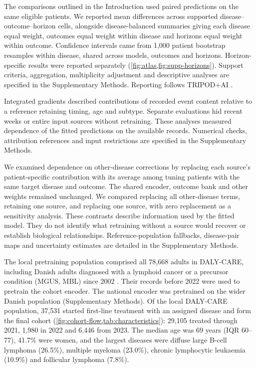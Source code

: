 The comparisons outlined in the Introduction used paired predictions on the
same eligible patients. We reported mean differences across supported
disease--outcome--horizon cells, alongside disease-balanced summaries giving
each disease equal weight, outcomes equal weight within disease and horizons
equal weight within outcome. Confidence intervals came from 1,000 patient
bootstrap resamples within disease, shared across models, outcomes and
horizons. Horizon-specific results were reported separately
(\cref{fig:atlas,fig:supp-horizons}). Support criteria, aggregation, multiplicity
adjustment and descriptive analyses are specified in the Supplementary Methods.
Reporting follows TRIPOD+AI \citep{collins2024tripodai}
.

Integrated gradients described contributions of recorded event content relative
to a reference retaining timing, age and subtype. Separate evaluations hid
recent weeks or entire input sources without retraining. These analyses
measured dependence of the fitted predictions on the available records.
Numerical checks, attribution references and input restrictions are specified
in the Supplementary Methods.

We examined dependence on other-disease corrections by replacing each source's
patient-specific contribution with its average among tuning patients with the
same target disease and outcome. The shared encoder, outcome bank and other
weights remained unchanged. We compared replacing all other-disease terms,
retaining one source, and replacing one source, with zero replacement as a
sensitivity analysis. These contrasts describe information used by the fitted
model. They do not identify what retraining without a source would recover or
establish biological relationships. Reference-population fallbacks, disease-pair
maps and uncertainty estimates are detailed in the Supplementary Methods.

\FloatBarrier
{}

The local pretraining population comprised all 78,668 adults in DALY-CARE,
including Danish adults diagnosed with a lymphoid cancer or a precursor
condition (MGUS, MBL) since 2002 \citep{brieghel2025dalycare}. Their records
before 2022 were used to pretrain the cohort encoder. The national encoder
was pretrained on the wider Danish population (Supplementary Methods).
Of the local DALY-CARE population, 37,531 started first-line treatment with an assigned disease
and form the final cohort (\cref{fig:cohort-flow,tab:characteristics}): 29,105
treated through 2021, 1,980 in 2022 and 6,446 from 2023. The median age was 69
years (IQR 60--77), 41.7\% were women, and the largest diseases were diffuse
large B-cell lymphoma (26.5\%), multiple myeloma (23.0\%), chronic lymphocytic
leukaemia (10.9\%) and follicular lymphoma (7.8\%).

